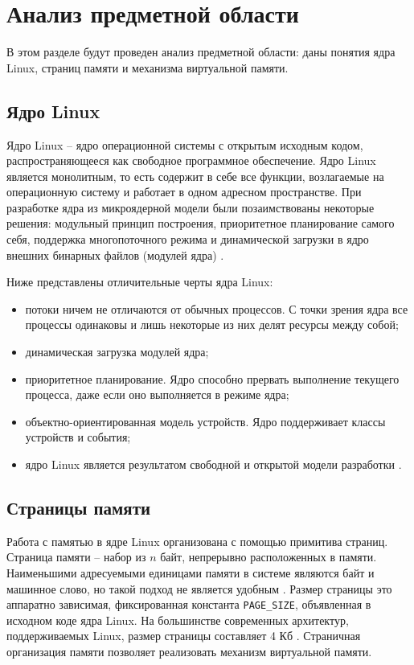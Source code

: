 \section{Анализ предметной области}

В этом разделе будут проведен анализ предметной области: даны понятия ядра Linux, страниц памяти и механизма виртуальной памяти.

\subsection{Ядро Linux}

Ядро Linux \cite{linux} -- ядро операционной системы с открытым исходным кодом, распространяющееся как свободное программное обеспечение. Ядро Linux является монолитным, то есть содержит в себе все функции, возлагаемые на операционную систему и работает в одном адресном пространстве. При разработке ядра из микроядерной модели были позаимствованы некоторые решения: модульный принцип построения, приоритетное планирование самого себя, поддержка многопоточного режима и динамической загрузки в ядро внешних бинарных файлов (модулей ядра) \cite{kernel-development}. 

Ниже представлены отличительные черты ядра Linux:

\begin{itemize}
	\item потоки ничем не отличаются от обычных процессов. С точки зрения ядра все процессы одинаковы и лишь некоторые из них делят ресурсы между собой;
	\item динамическая загрузка модулей ядра;
	\item приоритетное планирование. Ядро способно прервать выполнение текущего процесса, даже если оно выполняется в режиме ядра;
	\item объектно-ориентированная модель устройств. Ядро поддерживает классы устройств и события;
	\item ядро Linux является результатом свободной и открытой модели разработки \cite{kernel-development}.
\end{itemize}

\subsection{Страницы памяти}

Работа с памятью в ядре Linux организована с помощью примитива страниц. Страница памяти -- набор из $n$ байт, непрерывно расположенных в памяти. Наименьшими адресуемыми единицами памяти в системе являются байт и машинное слово, но такой подход не является удобным \cite{kernel-development}. Размер страницы это аппаратно зависимая, фиксированная константа \texttt{PAGE\_SIZE}, объявленная в исходном коде ядра Linux. На большинстве современных архитектур, поддерживаемых Linux, размер страницы составляет 4 Кб \cite{4kb-page-size}. Страничная организация памяти позволяет реализовать механизм виртуальной памяти.

